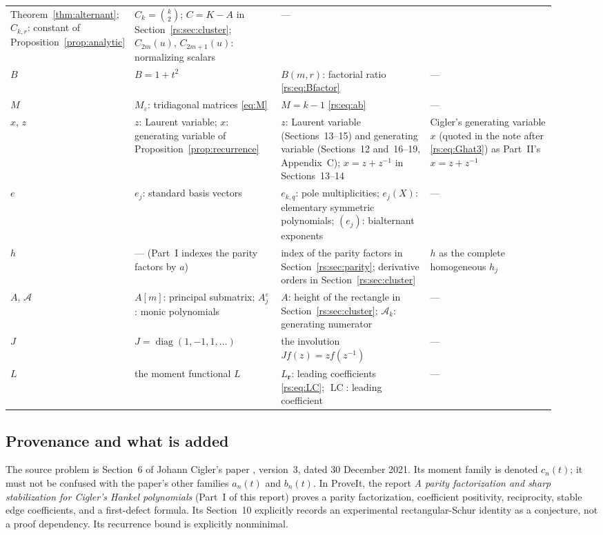 \documentclass[11pt]{article}
\theoremstyle{definition}
\theoremstyle{remark}
\newcommand{\diag}{\operatorname{diag}}
\newcommand{\eps}{\varepsilon}
\newcommand{\LC}{\operatorname{LC}}
\newcommand{\AN}{\mathscr A}
\theoremstyle{definition}
\theoremstyle{plain}
\numberwithin{equation}{section}
\begin{document}
{\begin{longtable}{@{}>{\raggedright\arraybackslash}p{0.12\linewidth}>{\raggedright\arraybackslash}p{0.27\linewidth}>{\raggedright\arraybackslash}p{0.29\linewidth}>{\raggedright\arraybackslash}p{0.24\linewidth}@{}}
Theorem~\ref{thm:alternant}; $C_{k,r}$: constant of
Proposition~\ref{prop:analytic} &
$C_k=\binom k2$; $C=K-A$ in Section~\ref{rs:sec:cluster}; $C_{2m}(u)$,
$C_{2m+1}(u)$: normalizing scalars &
---\\[3pt]
$B$ &
$B=1+t^2$ &
$B(m,r)$: factorial ratio \eqref{rs:eq:Bfactor} &
---\\[3pt]
$M$ &
$M_\eps$: tridiagonal matrices \eqref{eq:M} &
$M=k-1$ \eqref{rs:eq:ab} &
---\\[3pt]
$x$, $z$ &
$z$: Laurent variable; $x$: generating variable of
Proposition~\ref{prop:recurrence} &
$z$: Laurent variable (Sections~13--15) and generating variable
(Sections~12 and~16--19, Appendix~C); $x=z+z^{-1}$ in Sections~13--14 &
Cigler's generating variable $x$ (quoted in the note after
\eqref{rs:eq:Ghat3}) as Part~II's $x=z+z^{-1}$\\[3pt]
$e$ &
$e_j$: standard basis vectors &
$e_{k,q}$: pole multiplicities; $e_j(X)$: elementary symmetric
polynomials; $(e_j)$: bialternant exponents &
---\\[3pt]
$h$ &
--- (Part~I indexes the parity factors by $a$) &
index of the parity factors in Section~\ref{rs:sec:parity}; derivative
orders in Section~\ref{rs:sec:cluster} &
$h$ as the complete homogeneous $h_j$\\[3pt]
$A$, $\mathscr A$ &
$A[m]$: principal submatrix; $A_j^\eps$: monic polynomials &
$A$: height of the rectangle in Section~\ref{rs:sec:cluster};
$\AN_k$: generating numerator &
---\\[3pt]
$J$ &
$J=\diag(1,-1,1,\ldots)$ &
the involution $Jf(z)=zf(z^{-1})$ &
---\\[3pt]
$L$ &
the moment functional $L$ &
$L_{\boldsymbol r}$: leading coefficients \eqref{rs:eq:LC}; $\LC$: leading
coefficient &
---\\
\bottomrule
\end{longtable}}


\subsection{Provenance and what is added}
\label{rs:sec:source}
The source problem is Section~6 of Johann Cigler's paper
\cite{Cigler}, version~3, dated 30 December 2021. Its moment family is denoted
$c_n(t)$; it must not be confused with the paper's other families $a_n(t)$
and $b_n(t)$. In ProveIt, the report \emph{A parity factorization and sharp
stabilization for Cigler's Hankel polynomials} (Part~I of this report) proves a
parity factorization, coefficient positivity, reciprocity, stable edge
coefficients, and a first-defect formula. Its Section~10 explicitly records
an experimental rectangular-Schur identity as a conjecture, not a proof
dependency. Its recurrence bound is explicitly nonminimal.
\end{document}
